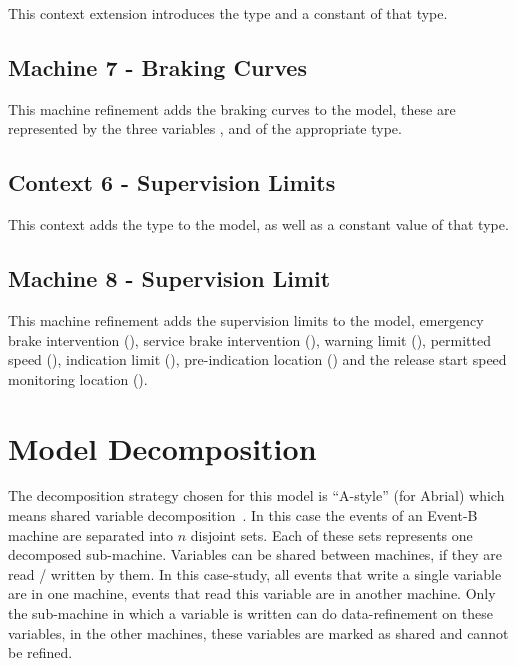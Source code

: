 \documentclass{template/openetcs_article}
\begin{document}
This context extension introduces the type  and a
constant of that type.

{\footnotesize


\subsection{Machine 7 - Braking Curves}
\label{sec:machine-7-braking}

This machine refinement adds the braking curves to the model, these are
represented by the three variables ,  and  of the
appropriate type.

{\footnotesize

}

\subsection{Context 6 - Supervision Limits}
\label{sec:cont-6-superv}

This context adds the type  to the model, as well
as a constant value of that type.

{\footnotesize

}

\subsection{Machine 8 - Supervision Limit}
\label{sec:mach-8-superv}

This machine refinement adds the supervision limits to the model, emergency
brake intervention (), service brake intervention (),
warning limit (), permitted speed (),
indication limit (), pre-indication location ()
and the release start speed monitoring location ().

{\footnotesize

}

\section{Model Decomposition}
\label{sec:model-decomposition}

The decomposition strategy chosen for this model is ``A-style'' (for Abrial)
which means shared variable decomposition~\cite{silva2011decomposition}. In this
case the events of an Event-B machine are separated into $n$ disjoint sets. Each
of these sets represents one decomposed sub-machine. Variables can be shared
between machines, if they are read / written by them. In this case-study, all
events that write a single variable are in one machine, events that read this
variable are in another machine. Only the sub-machine in which a variable is
written can do data-refinement on these variables, in the other machines, these
variables are marked as shared and cannot be refined.

}
\end{document}

